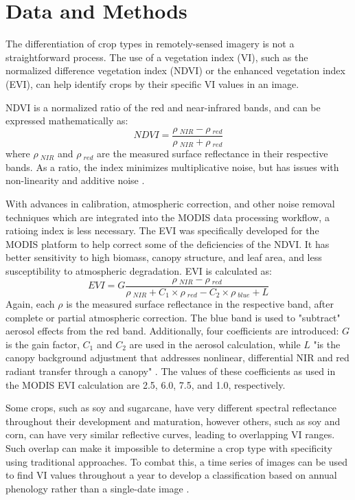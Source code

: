 \chapter{Data and Methods}

The differentiation of crop types in remotely-sensed imagery is not a straightforward process. The use of a vegetation index (VI), such as the normalized difference vegetation index (NDVI) or the enhanced vegetation index (EVI), can help identify crops by their specific VI values in an image.

NDVI is a normalized ratio of the red and near-infrared bands, and can be expressed mathematically as:
\begin{equation}
  NDVI = \frac{\rho~_{NIR} - \rho~_{red}}{\rho~_{NIR} + \rho~_{red}}
\end{equation}
where $\rho~_{NIR}$ and $\rho~_{red}$ are the measured surface reflectance in their respective bands. As a ratio, the index minimizes multiplicative noise, but has issues with non-linearity and additive noise \autocite{huete2002overview}.

With advances in calibration, atmospheric correction, and other noise removal techniques which are integrated into the MODIS data processing workflow, a ratioing index is less necessary. The EVI was specifically developed for the MODIS platform to help correct some of the deficiencies of the NDVI. It has better sensitivity to high biomass, canopy structure, and leaf area, and less susceptibility to atmospheric degradation. EVI is calculated as:
\begin{equation}
  EVI = G\frac{\rho~_{NIR} - \rho~_{red}}{\rho~_{NIR} +  C_1\times\rho~_{red} - C_2 \times \rho~_{blue} + L}
\end{equation}
Again, each $\rho$ is the measured surface reflectance in the respective band, after complete or partial atmospheric correction. The blue band is used to "subtract" aerosol effects from the red band. Additionally, four coefficients are introduced: $G$ is the gain factor, $C_1$ and $C_2$ are used in the aerosol calculation, while $L$ "is the canopy background adjustment that addresses nonlinear, differential NIR and red radiant transfer through a canopy" \citereset\autocite[196]{huete2002overview}. The values of these coefficients as used in the MODIS EVI calculation are 2.5, 6.0, 7.5, and 1.0, respectively.

Some crops, such as soy and sugarcane, have very different spectral reflectance throughout their development and maturation, however others, such as soy and corn, can have very similar reflective curves, leading to overlapping VI ranges. Such overlap can make it impossible to determine a crop type with specificity using traditional approaches. To combat this, a time series of images can be used to find VI values throughout a year to develop a classification based on annual phenology rather than a single-date image \autocites{gu2010phenological}{wardlow2002discriminating}{wardlow2005state-level}{wardlow2007analysis}{wardlow2008large-area}{zhang2003monitoring}.
	
